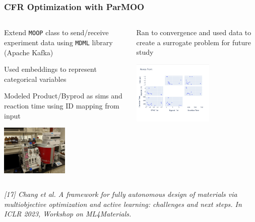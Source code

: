 \documentclass[aspectratio=169]{beamer}
\begin{document}
\begin{frame}\frametitle{CFR Optimization with ParMOO}

\begin{columns}
\begin{column}{0.5\textwidth}

\medskip
Extend {\tt MOOP} class to send/receive experiment data
using {\tt MDML} library (Apache Kafka)

\medskip
Used embeddings to represent
categorical variables

\medskip
Modeled Product/Byprod as sims and reaction time using ID
mapping from input

\begin{center}
\includegraphics[width=0.5\textwidth]{../img/probs/cfr-nmr-setup.jpg}\\
\end{center}
\end{column}
\begin{column}{0.5\textwidth}
\begin{center}
Ran to convergence and used data to create a surrogate problem
for future study\\

\bigskip

\includegraphics[width=0.6\textwidth]{../img/moo_new/cfr_pareto_front.png}\\
\end{center}
\end{column}
\end{columns}

\vfill

{\tiny\it
[17] Chang et al.
A framework for fully autonomous design of materials via multiobjective optimization and active learning: challenges and next steps.
In {\sl ICLR 2023, Workshop on ML4Materials}.\\
}

\end{frame}
\end{document}
